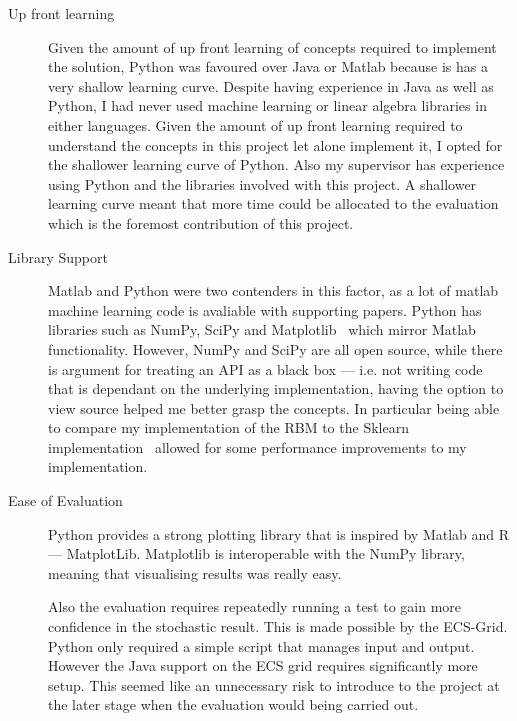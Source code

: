 \begin{description}
\item[Up front learning] Given the amount of up front learning of concepts required to implement the solution, Python was favoured over Java or Matlab because is has a very shallow learning curve. Despite having experience in Java as well as Python, I had never used machine learning or linear algebra libraries in either languages. Given the amount of up front learning required to understand the concepts in this project let alone implement it, I opted for the shallower learning curve of Python. Also my supervisor has experience using Python and the libraries involved with this project. A shallower learning curve meant that more time could be allocated to the evaluation which is the foremost contribution of this project.
\item[Library Support] Matlab and Python were two contenders in this factor, as a lot of matlab machine learning code is avaliable with supporting papers. Python has libraries such as NumPy, SciPy and Matplotlib~\cite{2015HistSciPy} which mirror Matlab functionality. However, NumPy and SciPy are all open source, while there is argument for treating an API as a black box --- i.e. not writing code that is dependant on the underlying implementation, having the option to view source helped me better grasp the concepts. In particular being able to compare my implementation of the RBM to  the Sklearn implementation~\cite{scikit-learn} allowed for some performance improvements to my implementation.
\item[Ease of Evaluation] Python provides a strong plotting library that is inspired by Matlab and R --- MatplotLib. Matplotlib is interoperable with the NumPy library, meaning that visualising results was really easy.

Also the evaluation requires repeatedly running a test to gain more confidence in the stochastic result. This is made possible by the ECS-Grid. Python only required a simple script that manages input and output. However the Java support on the ECS grid requires significantly more setup. This seemed like an unnecessary risk to introduce to the project at the later stage when the evaluation would being carried out.
\end{description}
%


